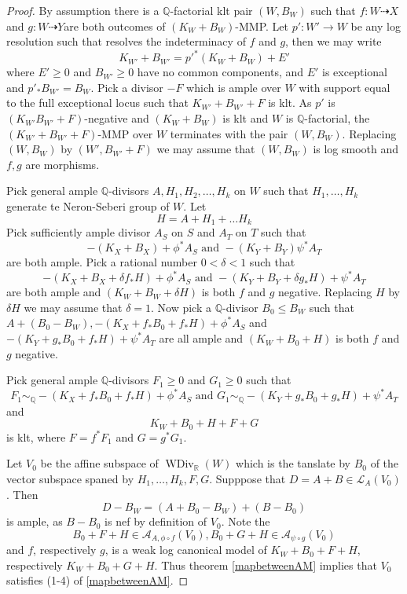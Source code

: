 \documentclass{article}
\begin{document}
\begin{proof}

  By assumption there is a $\mathbb{Q}$-factorial klt pair $(W,B_{W})$ such that $f:W\dashrightarrow X$ and $g:W \dashrightarrow Y$are both outcomes of $(K_{W}+B_{W})$-MMP. Let $p':W'\to W$ be any log resolution such that resolves the indeterminacy of $f$ and $g$, then we may write
  \[
    K_{W'}+B_{W'}=p'^*(K_{W}+B_{W})+E'
  \]
where $E'\geqslant 0$ and $B_{W'}\geqslant 0$ have no common components, and $E'$ is exceptional and $p'_*B_{W'}=B_{W}$. Pick a divisor $-F$ which is ample over $W$ with support equal to the full exceptional locus such that $K_{W'}+B_{W'}+F$ is klt. As $p'$ is $(K_{W'}
B_{W'}+F)$-negative and $(K_{W}+B_{W})$ is klt and $W$ is $\mathbb{Q}$-factorial, the $(K_{W'}+B_{W'}+F)$-MMP over $W$ terminates with the pair $(W,B_{W})$. Replacing $(W,B_{W})$ by $(W',B_{W'} +F)$ we may assume that $(W,B_{W})$ is log smooth and $f,g$ are morphisms.

Pick general ample $\mathbb{Q}$-divisors $A, H_{1},H_{2},\ldots ,H_{k}$ on $W$ such that $H_{1},\ldots , H_{k}$ generate te Neron-Seberi group of $W$. Let 
\[
  H=A+H_{1}+\ldots H_{k}
\]
Pick sufficiently ample divisor $A_{S}$ on $S$ and $A_{T}$ on $T$ such that
\[
-(K_{X}+B_{X})+\phi^*A_{S} \text{ and } -(K_{Y}+B_{Y})\psi^*A_{T}
\]
are both ample. Pick a rational number $0<\delta<1$ such that 
\[
  -(K_{X}+B_{X}+\delta f_*H)+\phi^*A_{S} \text{ and } -(K_{Y}+B_{Y}+\delta g_*H)+\psi^*A_{T}
\]
are both ample and $(K_{W}+B_{W}+\delta H)$ is both  $f$ and  $g$ negative. Replacing $H$ by $\delta H$ we may assume that $\delta=1$. Now pick a $\mathbb{Q}$-divisor $B_{0}\leqslant B_{W}$ such that $A+(B_{0}-B_{W}), -(K_{X}+ f_*B_{0}+f_*H)+\phi^*A_{S}$ and $-(K_{Y}+ g_*B_{0}+f_*H)+\psi^*A_{T}$  are all ample and $(K_{W}+B_{0}+H)$ is both  $f$ and  $g$ negative.

Pick general ample $\mathbb{Q}$-divisors $F_{1}\geqslant 0$ and $G_{1}\geqslant 0$  such that
\[
F_{1}\sim_{\mathbb{Q}} -(K_{X}+f_*B_{0}+ f_*H)+\phi^*A_{S} \text{ and } G_{1}\sim_{\mathbb{Q}} -(K_{Y}+g_*B_{0}+ g_*H)+\psi^*A_{T}
\]
and 
\[
  K_{W}+B_{0}+H+F+G
\]
is klt, where $F=f^*F_{1}$ and $G=g^*G_{1}$. 

Let $V_{0}$ be the affine subspace of $\operatorname{WDiv}_{\mathbb{R}}(W)$ which is the tanslate by $B_{0}$ of the vector subspace  spaned by $H_{1},\ldots , H_{k},F,G$. Supppose that $D=A+B \in \mathcal{L}_{A}(V_{0})$. Then 
\[
  D-B_W=(A+B_{0}-B_{W})+(B-B_{0})
\]
is ample, as $B-B_{0}$ is nef by definition of $V_{0}$. Note the 
\[
  B_{0}+F+H \in \mathcal{A}_{A,\phi\circ f}(V_{0}), B_{0}+G+H \in \mathcal{A}_{\psi \circ g}(V_{0})
\]
and $f$, respectively $g$, is a weak log canonical model of $K_{W}+B_{0}+F+H$, respectively $K_{W}+B_{0}+G+H$. Thus theorem \ref{mapbetweenAM} implies that $V_{0}$ satisfies (1-4) of \ref{mapbetweenAM}.


\end{proof}
\end{document}
